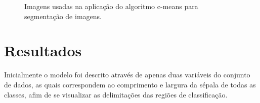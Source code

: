 \documentclass[12pt,a4paper]{article}
\numberwithin{equation}{section}
\begin{document}
\begin{figure}[!htbp]
	\centering
	\caption{Imagens usadas na aplicação do algoritmo c-means para segmentação de imagens.}
	\label{fig:images}
\end{figure}

\section{Resultados}

Inicialmente o modelo foi descrito através de apenas duas variáveis do conjunto de dados, as quais correspondem ao comprimento e largura da sépala de todas as classes, afim de se visualizar as delimitações das regiões de classificação.
\end{document}
